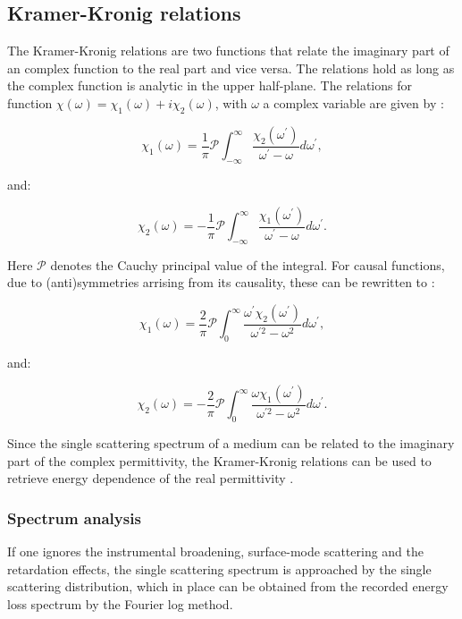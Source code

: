 \subsection{Kramer-Kronig relations} \label{sect_K_K}
The Kramer-Kronig relations are two functions that relate the imaginary part of an complex function to the real part and vice versa. The relations hold as long as the complex function is analytic in the upper half-plane.
The relations for function $\chi(\omega)=\chi_{1}(\omega)+i \chi_{2}(\omega)$, with $\omega$ a complex variable are given by \cite{wikipedia_2020}:

\begin{equation}
    \chi_{1}(\omega)=\frac{1}{\pi} \mathcal{P} \int_{-\infty}^{\infty} \frac{\chi_{2}\left(\omega^{\prime}\right)}{\omega^{\prime}-\omega} d \omega^{\prime},
\end{equation}

and:

\begin{equation}
    \chi_{2}(\omega)=-\frac{1}{\pi} \mathcal{P} \int_{-\infty}^{\infty} \frac{\chi_{1}\left(\omega^{\prime}\right)}{\omega^{\prime}-\omega} d \omega^{\prime}.
\end{equation}

Here $\mathcal{P}$ denotes the Cauchy principal value of the integral. For causal functions, due to (anti)symmetries arrising from its causality, these can be rewritten to \cite{wikipedia_2020}:

\begin{equation}\label{eq_ch1_1}
    \chi_{1}(\omega)=\frac{2}{\pi} \mathcal{P} \int_{0}^{\infty} \frac{\omega^{\prime} \chi_{2}\left(\omega^{\prime}\right)}{\omega^{\prime 2}-\omega^{2}} d \omega^{\prime},
\end{equation}

and:

\begin{equation}
    \chi_{2}(\omega)=-\frac{2}{\pi} \mathcal{P} \int_{0}^{\infty} \frac{\omega \chi_{1}\left(\omega^{\prime}\right)}{\omega^{\prime 2}-\omega^{2}} d \omega^{\prime}.
\end{equation}


Since the single scattering spectrum of a medium can be related to the imaginary part of the complex permittivity, the Kramer-Kronig relations can be used to retrieve energy dependence of the real permittivity \cite{egerton_book}. 




\subsubsection{Spectrum analysis}
If one ignores the instrumental broadening, surface-mode scattering and the retardation effects, the single scattering spectrum is approached by the single scattering distribution, which in place can be obtained from the recorded energy loss spectrum by the Fourier log method. \cite{egerton_book}

